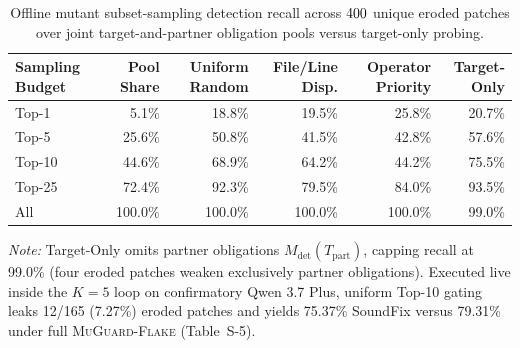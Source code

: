 \begin{table}[t]
\centering
\scriptsize
\setlength{\tabcolsep}{6.0pt}
\caption{Offline mutant subset-sampling detection recall across $400$ unique eroded patches over joint target-and-partner obligation pools versus target-only probing.}
\label{tab:topk}
\begin{tabular}{lrrrrr}
\toprule
Sampling Budget & Pool Share & Uniform Random & File/Line Disp. & Operator Priority & Target-Only \\
\midrule
Top-1 & 5.1\% & 18.8\% & 19.5\% & 25.8\% & 20.7\% \\
Top-5 & 25.6\% & 50.8\% & 41.5\% & 42.8\% & 57.6\% \\
Top-10 & 44.6\% & 68.9\% & 64.2\% & 44.2\% & 75.5\% \\
Top-25 & 72.4\% & 92.3\% & 79.5\% & 84.0\% & 93.5\% \\
All & 100.0\% & 100.0\% & 100.0\% & 100.0\% & 99.0\% \\
\bottomrule
\end{tabular}
\par\smallskip\parbox{0.96\textwidth}{\scriptsize\textit{Note:} Target-Only omits partner obligations $M_{\text{det}}(T_{\text{part}})$, capping recall at 99.0\% (four eroded patches weaken exclusively partner obligations). Executed live inside the $K=5$ loop on confirmatory Qwen 3.7 Plus, uniform Top-10 gating leaks 12/165 (7.27\%) eroded patches and yields 75.37\% SoundFix versus 79.31\% under full \textsc{MuGuard-Flake} (Table~S-5).}
\end{table}
